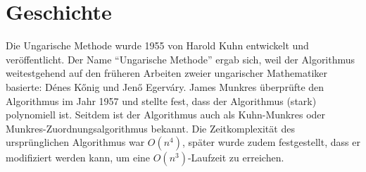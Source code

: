 %
%
%
\section{Geschichte\label{munkres:section:teil0}}
Die Ungarische Methode wurde 1955 von Harold Kuhn entwickelt und veröffentlicht.
Der Name ``Ungarische Methode'' ergab sich, weil der Algorithmus
weitestgehend auf den früheren Arbeiten zweier ungarischer Mathematiker
basierte: Dénes Kőnig und Jenő Egerváry.
James Munkres überprüfte den Algorithmus im Jahr 1957 und stellte fest,
dass der Algorithmus (stark) polynomiell ist.
Seitdem ist der Algorithmus auch als Kuhn-Munkres oder
Munkres-Zuordnungsalgorithmus bekannt.
Die Zeitkomplexität des ursprünglichen Algorithmus war $O(n^4)$,
später wurde zudem festgestellt, dass er modifiziert werden kann,
um eine  $O(n^3)$-Laufzeit zu erreichen.




